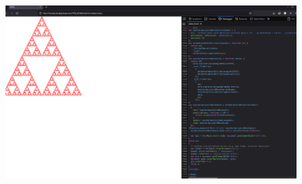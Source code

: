 \documentclass{article}
\begin{document}
\begin{figure}[!ht]
    \centering
    \includegraphics[width=\textwidth]{elm-keyrsla}
\end{figure}
\end{document}
